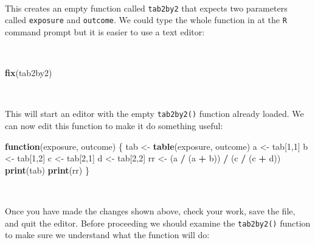 \documentclass[12pt,a4paper]{book}
\newenvironment{Shaded}{\begin{snugshade}}{\end{snugshade}}
\newcommand{\ControlFlowTok}[1]{\textcolor[rgb]{0.13,0.29,0.53}{\textbf{#1}}}
\newcommand{\DecValTok}[1]{\textcolor[rgb]{0.00,0.00,0.81}{#1}}
\newcommand{\KeywordTok}[1]{\textcolor[rgb]{0.13,0.29,0.53}{\textbf{#1}}}
\newcommand{\NormalTok}[1]{#1}
\newcommand{\OperatorTok}[1]{\textcolor[rgb]{0.81,0.36,0.00}{\textbf{#1}}}
\newcommand{\StringTok}[1]{\textcolor[rgb]{0.31,0.60,0.02}{#1}}
\theoremstyle{definition}
\theoremstyle{definition}
\theoremstyle{definition}
\theoremstyle{remark}
\begin{document}
~

This creates an empty function called \texttt{tab2by2} that expects two
parameters called \texttt{exposure} and \texttt{outcome}. We could type
the whole function in at the \texttt{R} command prompt but it is easier
to use a text editor:

~

\begin{Shaded}
\begin{Highlighting}[]
\KeywordTok{fix}\NormalTok{(tab2by2)}
\end{Highlighting}
\end{Shaded}

~

This will start an editor with the empty \texttt{tab2by2()} function
already loaded. We can now edit this function to make it do something
useful:

\newpage

\begin{Shaded}
\begin{Highlighting}[]
\ControlFlowTok{function}\NormalTok{(exposure, outcome)}
\NormalTok{  \{}
\NormalTok{  tab <-}\StringTok{ }\KeywordTok{table}\NormalTok{(exposure, outcome)}
\NormalTok{  a <-}\StringTok{ }\NormalTok{tab[}\DecValTok{1}\NormalTok{,}\DecValTok{1}\NormalTok{]}
\NormalTok{  b <-}\StringTok{ }\NormalTok{tab[}\DecValTok{1}\NormalTok{,}\DecValTok{2}\NormalTok{]}
\NormalTok{  c <-}\StringTok{ }\NormalTok{tab[}\DecValTok{2}\NormalTok{,}\DecValTok{1}\NormalTok{]}
\NormalTok{  d <-}\StringTok{ }\NormalTok{tab[}\DecValTok{2}\NormalTok{,}\DecValTok{2}\NormalTok{]}
\NormalTok{  rr <-}\StringTok{ }\NormalTok{(a }\OperatorTok{/}\StringTok{ }\NormalTok{(a }\OperatorTok{+}\StringTok{ }\NormalTok{b)) }\OperatorTok{/}\StringTok{ }\NormalTok{(c }\OperatorTok{/}\StringTok{ }\NormalTok{(c }\OperatorTok{+}\StringTok{ }\NormalTok{d))}
  \KeywordTok{print}\NormalTok{(tab)}
  \KeywordTok{print}\NormalTok{(rr) }
\NormalTok{  \}}
\end{Highlighting}
\end{Shaded}

~

Once you have made the changes shown above, check your work, save the
file, and quit the editor. Before proceeding we should examine the
\texttt{tab2by2()} function to make sure we understand what the function
will do:
\end{document}
